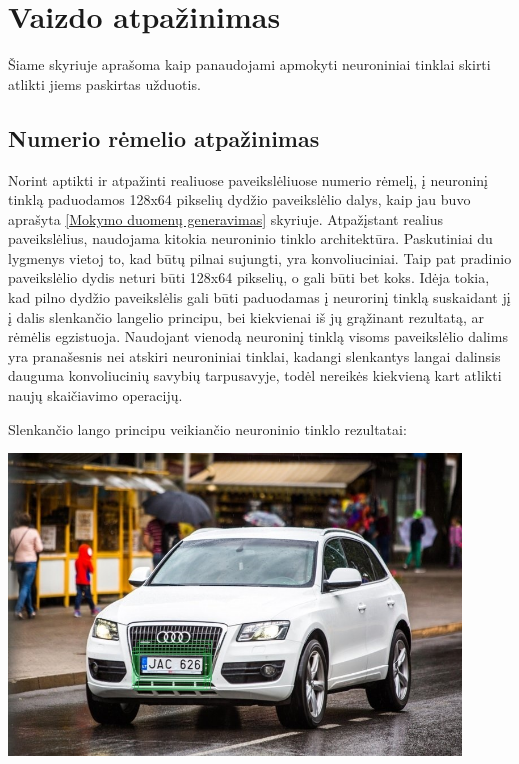 \documentclass{VUMIFInfBakalaurinis}
\begin{document}
\pagebreak
\section{Vaizdo atpažinimas}
Šiame skyriuje aprašoma kaip panaudojami apmokyti neuroniniai tinklai skirti atlikti jiems paskirtas užduotis.

\subsection{Numerio rėmelio atpažinimas}
Norint aptikti ir atpažinti realiuose paveikslėliuose numerio rėmelį, į neuroninį tinklą paduodamos 128x64 pikselių dydžio
paveikslėlio dalys, kaip jau buvo aprašyta \ref{Mokymo duomenų generavimas} skyriuje.
Atpažįstant realius paveikslėlius, naudojama kitokia neuroninio tinklo architektūra. Paskutiniai du lygmenys vietoj to, 
kad būtų pilnai sujungti, yra konvoliuciniai. Taip pat pradinio paveikslėlio dydis neturi būti 128x64 pikselių, o gali būti
bet koks. Idėja tokia, kad pilno dydžio paveikslėlis gali būti paduodamas į neurorinį tinklą suskaidant jį į dalis slenkančio
langelio principu, bei kiekvienai iš jų grąžinant rezultatą, ar rėmėlis egzistuoja. Naudojant vienodą neuroninį tinklą visoms 
paveikslėlio dalims yra pranašesnis nei atskiri neuroniniai tinklai, kadangi slenkantys langai dalinsis dauguma konvoliucinių 
savybių tarpusavyje, todėl nereikės kiekvieną kart atlikti naujų skaičiavimo operacijų.

Slenkančio lango principu veikiančio neuroninio tinklo rezultatai:

\begin{minipage}{\linewidth}
  \centering
  \includegraphics[width=12cm]{sliding.jpg}
  \label{daug_remeliu}
\end{minipage}
\end{document}
